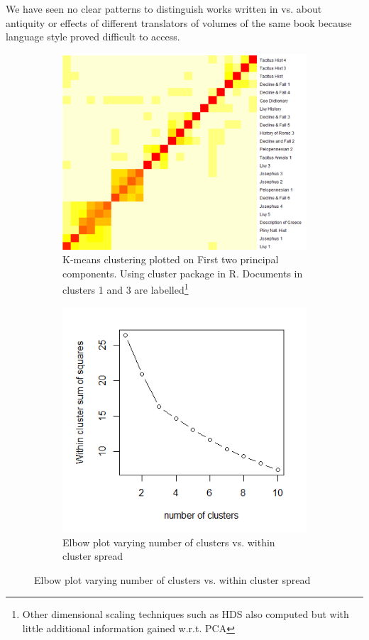 \documentclass{sig-alternate-05-2015}
\begin{document}
We have seen no clear patterns to distinguish works written in vs. about antiquity or effects of different translators of volumes of the same book because language style proved difficult to access. 

\begin{figure}
\begin{subfigure}{.3\textwidth}
	\centering
	\includegraphics[width=\linewidth]{heatmap2.png}
	\caption{K-means clustering plotted on First two principal components. Using cluster package in R. Documents in clusters 1 and 3 are labelled\footnote{Other dimensional scaling techniques such as HDS also computed but with little additional information gained w.r.t. PCA}}
	\label{fig:kmeans}
\end{subfigure}%

\begin{subfigure}{.3\textwidth}
\centering
\includegraphics[width=\linewidth]{elbow.png}
\caption{Elbow plot varying number of clusters vs. within cluster spread}
\label{fig:elbow}
\end{subfigure}%


\end{figure}
\end{document}
